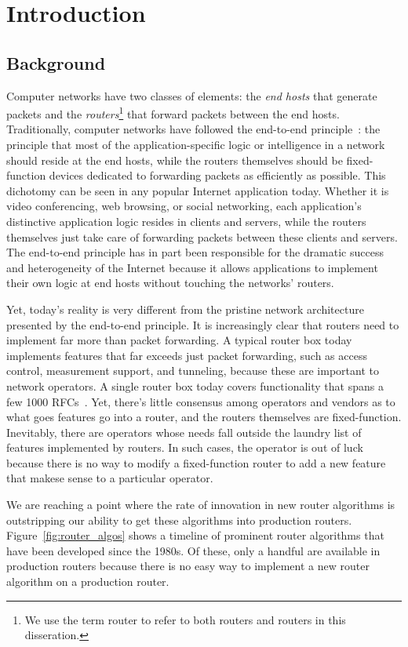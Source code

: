 \chapter{Introduction}
\label{chap:intro}

\section{Background}
Computer networks have two classes of elements: the \textit{end hosts} that
generate packets and the \textit{routers}\footnote{We use the term router to
refer to both routers and routers in this disseration.} that forward packets
between the end hosts. Traditionally, computer networks have followed the
end-to-end principle~\cite{e2e}: the principle that most of the
application-specific logic or intelligence in a network should reside at the
end hosts, while the routers themselves should be fixed-function devices
dedicated to forwarding packets as efficiently as possible. This dichotomy can
be seen in any popular Internet application today. Whether it is video
conferencing, web browsing, or social networking, each application's
distinctive application logic resides in clients and servers, while the routers
themselves just take care of forwarding packets between these clients and
servers. The end-to-end principle has in part been responsible for the dramatic
success and heterogeneity of the Internet because it allows applications to
implement their own logic at end hosts without touching the networks' routers.

Yet, today's reality is very different from the pristine network architecture
presented by the end-to-end principle. It is increasingly clear that routers
need to implement far more than packet forwarding. A typical router box today
implements features that far exceeds just packet forwarding, such as access
control, measurement support, and tunneling, because these are important to
network operators. A single router box today covers functionality that spans a
few 1000 RFCs~\cite{lavanya_compiler}. Yet, there's little consensus among
operators and vendors as to what goes features go into a router, and the
routers themselves are fixed-function. Inevitably, there are operators whose
needs fall outside the laundry list of features implemented by routers. In such
cases, the operator is out of luck because there is no way to modify a
fixed-function router to add a new feature that makese sense to a particular
operator.

We are reaching a point where the rate of innovation in new router algorithms
is outstripping our ability to get these algorithms into production routers.
Figure~\ref{fig:router_algos} shows a timeline of prominent router algorithms
that have been developed since the 1980s. Of these, only a handful are
available in production routers because there is no easy way to implement a new
router algorithm on a production router.

